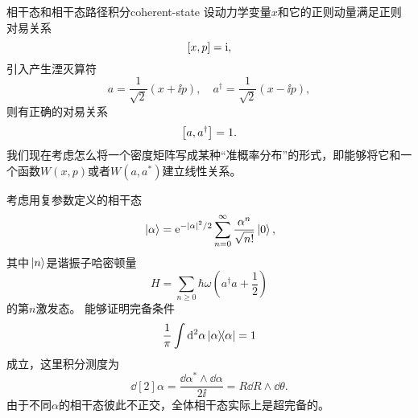 \begin{back}{相干态和相干态路径积分}{coherent-state}
    设动力学变量$x$和它的正则动量满足正则对易关系
    \begin{equation}
        \comm{x}{p} = \ii,
    \end{equation}
    引入产生湮灭算符
    \begin{equation}
        a = \frac{1}{\sqrt{2}} (x + \ii p), \quad a^\dagger = \frac{1}{\sqrt{2}} (x - \ii p),
    \end{equation}
    则有正确的对易关系
    \begin{equation}
        \comm{a}{a^\dagger} = 1.
    \end{equation}
    我们现在考虑怎么将一个密度矩阵写成某种“准概率分布”的形式，即能够将它和一个函数$W(x, p)$或者$W(a, a^*)$建立线性关系。

    考虑用复参数定义的相干态
    \begin{equation}
        \ket*{\alpha} = \mathrm{e}^{- \abs*{\alpha}^2 / 2} \sum_{n = 0}^\infty \frac{\alpha^n}{\sqrt{n!}} \ket*{0},
    \end{equation}
    其中$\ket*{n}$是谐振子哈密顿量
    \begin{equation}
        H = \sum_{n \geq 0} \hbar \omega \left( a^\dagger a + \frac{1}{2} \right) 
    \end{equation}
    的第$n$激发态。
    能够证明完备条件
    \begin{equation}
        \frac{1}{\pi} \int \dd[2]{\alpha} \dyad{\alpha} = 1
    \end{equation}
    成立，这里积分测度为
    \begin{equation}
        \dd[2]{\alpha} = \frac{\dd{\alpha^*} \wedge \dd{\alpha}}{2 \ii} = R \dd{R} \wedge \dd{\theta}.
    \end{equation}
    由于不同$\alpha$的相干态彼此不正交，全体相干态实际上是超完备的。

\end{back}